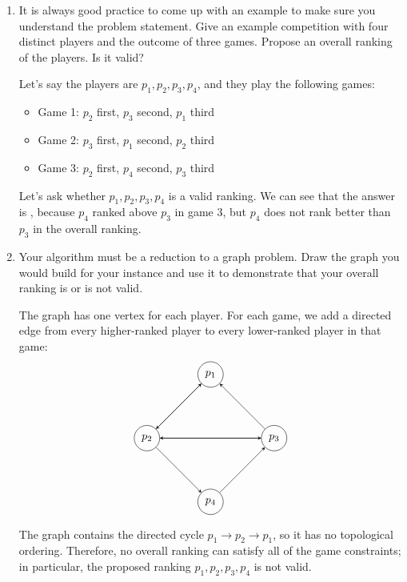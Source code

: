 \documentclass[11pt]{article}
\begin{document}
\begin{enumerate}
    \item It is always good practice to come up with an example to make sure you
    understand the problem statement. Give an example competition with four
    distinct players and the outcome of three games. Propose an overall ranking of the players.
    Is it valid?
    \begin{Solution}
    Let's say the players are $p_1, p_2, p_3, p_4$, and they play the following games:
    \begin{itemize}
        \item Game 1: $p_2$ first, $p_3$ second, $p_1$ third
        \item Game 2: $p_3$ first, $p_1$ second, $p_2$ third
        \item Game 3: $p_2$ first, $p_4$ second, $p_3$ third
    \end{itemize}
    Let's ask whether $p_1, p_2, p_3, p_4$ is a valid ranking.  We can see that
    the answer is , because $p_4$ ranked above $p_3$ in game 3, but
    $p_4$ does not rank better than $p_3$ in the overall ranking.
    \end{Solution}
    \item Your algorithm must be a reduction to a graph problem. Draw the graph
    you would build for your instance and use it to demonstrate that your overall ranking
    is or is not valid.
    \begin{Solution}
    The graph has one vertex for each player.  For each game, we add a directed
    edge from every higher-ranked player to every lower-ranked player in that game:
    \[
    \begin{tikzpicture}[
        player/.style={circle, draw, minimum size=8mm, inner sep=0pt},
        >=stealth,
        every edge/.style={draw, ->},
        edge label/.style={font=\scriptsize, fill=white, inner sep=1pt}
    ]
        \node[player] (p1) at (0,2) {$p_1$};
        \node[player] (p2) at (-2,0) {$p_2$};
        \node[player] (p3) at (2,0) {$p_3$};
        \node[player] (p4) at (0,-2) {$p_4$};

        \path (p2) edge  (p3)
                    edge  (p1)
                    edge  (p4);
        \path (p3) edge  (p1)
                    edge (p2);
        \path (p1) edge  (p2);
        \path (p4) edge  (p3);
    \end{tikzpicture}
    \]
    The graph contains the directed cycle
    $p_1\mathbin{\to}p_2\mathbin{\to}p_1$, so it has no topological ordering.
    Therefore, no overall ranking can satisfy all of the game constraints; in
    particular, the proposed ranking $p_1,p_2,p_3,p_4$ is not valid.
    \end{Solution}


\end{enumerate}
\end{document}
